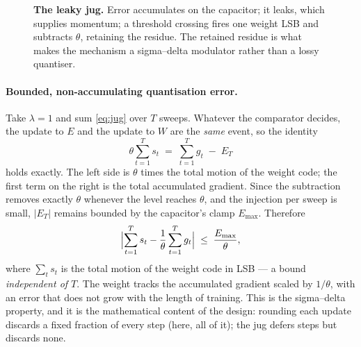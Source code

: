 \documentclass[11pt]{article}
\begin{document}
\begin{figure}[t]
\centering
{}
\caption{\textbf{The leaky jug.} Error accumulates on the capacitor; it leaks, which supplies
momentum; a threshold crossing fires one weight LSB and subtracts $\theta$, retaining the residue.
The retained residue is what makes the mechanism a sigma--delta modulator rather than a lossy
quantiser.}
\label{fig:jug}
\end{figure}

\paragraph{Bounded, non-accumulating quantisation error.} Take $\lambda = 1$ and sum
\eqref{eq:jug} over $T$ sweeps. Whatever the comparator decides, the update to $E$ and the update to
$W$ are the \emph{same} event, so the identity
\begin{equation}
\theta \sum_{t=1}^{T} s_t \;=\; \sum_{t=1}^{T} g_t \;-\; E_T
\label{eq:invariant}
\end{equation}
holds exactly. The left side is $\theta$ times the total motion of the weight code; the first term on
the right is the total accumulated gradient. Since the subtraction removes exactly $\theta$ whenever
the level reaches $\theta$, and the injection per sweep is small, $|E_T|$ remains bounded by the
capacitor's clamp $E_{\max}$. Therefore
\begin{equation}
\Bigl| \sum_{t=1}^{T} s_t - \frac{1}{\theta}\sum_{t=1}^{T} g_t \Bigr|
\;\le\; \frac{E_{\max}}{\theta},
\label{eq:bound}
\end{equation}
where $\sum_t s_t$ is the total motion of the weight code in LSB --- a bound \emph{independent of
$T$}. The weight tracks the accumulated gradient scaled by $1/\theta$,
with an error that does not grow with the length of training. This is the sigma--delta property, and
it is the mathematical content of the design: rounding each update discards a fixed fraction of every
step (here, all of it); the jug defers steps but discards none.
\end{document}
